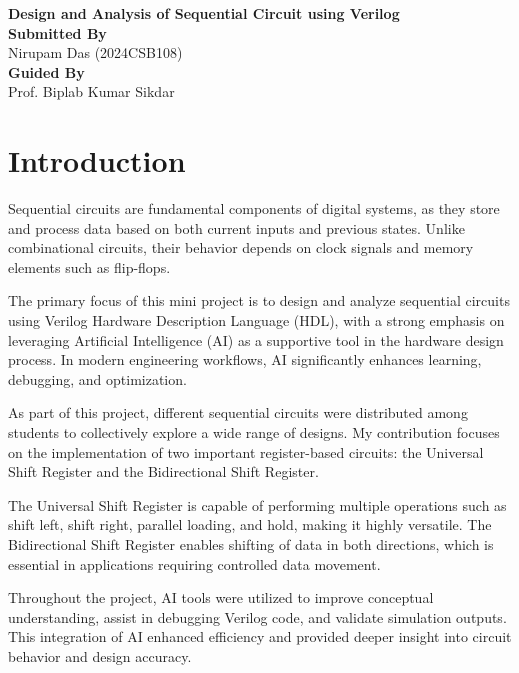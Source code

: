 \documentclass[12pt]{article}
\begin{document}
\begin{center}

\vspace*{1.5cm}

{\LARGE \textbf{Design and Analysis of Sequential Circuit using Verilog}}\\[1.5cm]

{\large \textbf{Submitted By}}\\
Nirupam Das (2024CSB108)\\[0.8cm]

{\large \textbf{Guided By}}\\
Prof. Biplab Kumar Sikdar\\[2cm]

\end{center}

\section*{Introduction}

Sequential circuits are fundamental components of digital systems, as they store and process data based on both current inputs and previous states. Unlike combinational circuits, their behavior depends on clock signals and memory elements such as flip-flops.

The primary focus of this mini project is to design and analyze sequential circuits using Verilog Hardware Description Language (HDL), with a strong emphasis on leveraging Artificial Intelligence (AI) as a supportive tool in the hardware design process. In modern engineering workflows, AI significantly enhances learning, debugging, and optimization.

As part of this project, different sequential circuits were distributed among students to collectively explore a wide range of designs. My contribution focuses on the implementation of two important register-based circuits: the Universal Shift Register and the Bidirectional Shift Register.

The Universal Shift Register is capable of performing multiple operations such as shift left, shift right, parallel loading, and hold, making it highly versatile. The Bidirectional Shift Register enables shifting of data in both directions, which is essential in applications requiring controlled data movement.

Throughout the project, AI tools were utilized to improve conceptual understanding, assist in debugging Verilog code, and validate simulation outputs. This integration of AI enhanced efficiency and provided deeper insight into circuit behavior and design accuracy.
\end{document}
